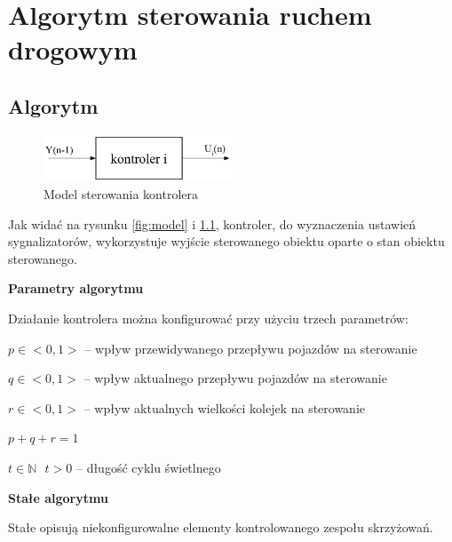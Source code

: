 \chapter{Algorytm sterowania ruchem drogowym}
\section{Algorytm}
\begin{figure}[h]
    \centering
    \includegraphics[width=0.5\textwidth]{images/kontroler.pdf}
    \caption{Model sterowania kontrolera}
    \label{fig:kontroler}
\end{figure}

Jak widać na rysunku \ref{fig:model} i \ref{fig:kontroler}, kontroler, do wyznaczenia ustawień sygnalizatorów, wykorzystuje wyjście sterowanego obiektu oparte o stan obiektu sterowanego.

\vspace{1.5cm}
\textbf{Parametry algorytmu}

Działanie kontrolera można konfigurować przy użyciu trzech parametrów:
\vspace{0.5cm}

\begin{math} p \in <0, 1> \end{math} \textrm{ -- wpływ przewidywanego przepływu pojazdów na sterowanie}

\begin{math} q \in <0, 1> \end{math} \textrm{ -- wpływ aktualnego przepływu pojazdów na sterowanie}

\begin{math} r \in <0, 1> \end{math} \textrm{ -- wpływ aktualnych wielkości kolejek na sterowanie}

\begin{math} p + q + r = 1 \end{math}

\begin{math} t \in \mathbb{N} \textrm{ } t > 0 \end{math} \textrm{ -- długość cyklu świetlnego}

\vspace{1.5cm}
\textbf{Stałe algorytmu}

Stałe opisują niekonfigurowalne elementy kontrolowanego zespołu skrzyżowań.
\vspace{0.5cm}

